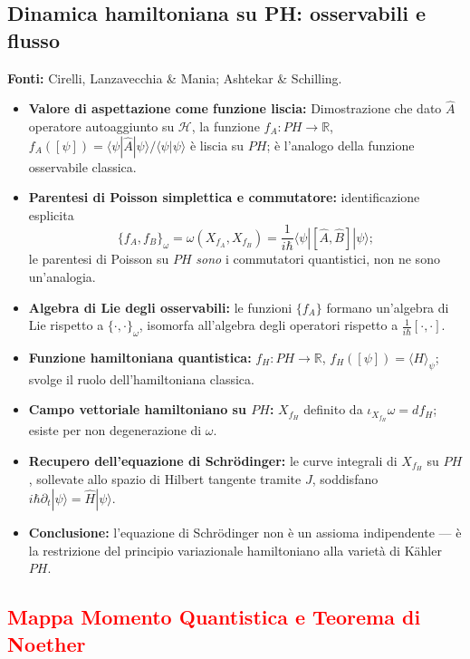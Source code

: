 \documentclass[12pt, a4paper]{article}
\newcommand{\fonti}[1]{%
	\begin{fontebox}
		\textcolor{fontecolor}{\footnotesize\textbf{Fonti:} #1}
	\end{fontebox}%
}
\begin{document}
	\subsection{Dinamica hamiltoniana su PH: osservabili e flusso}
	
	\fonti{Cirelli, Lanzavecchia \& Mania; Ashtekar \& Schilling.}
	
	\begin{itemize}
		\item \textbf{Valore di aspettazione come funzione liscia:} Dimostrazione che dato $\hat{A}$ operatore autoaggiunto su $\mathcal{H}$, la funzione $f_A: PH \to \mathbb{R}$, $f_A([\psi]) = \langle\psi|\hat{A}|\psi\rangle / \langle\psi|\psi\rangle$ è liscia su $PH$; è l'analogo della funzione osservabile classica.
		\item \textbf{Parentesi di Poisson simplettica e commutatore:} identificazione esplicita
		\[
		\{f_A, f_B\}_\omega = \omega(X_{f_A}, X_{f_B}) = \frac{1}{i\hbar}\langle\psi|[\hat{A},\hat{B}]|\psi\rangle;
		\]
		le parentesi di Poisson su $PH$ \emph{sono} i commutatori quantistici, non ne sono un'analogia.
		\item \textbf{Algebra di Lie degli osservabili:} le funzioni $\{f_A\}$ formano un'algebra di Lie rispetto a $\{\cdot,\cdot\}_\omega$, isomorfa all'algebra degli operatori rispetto a $\frac{1}{i\hbar}[\cdot,\cdot]$.
		\item \textbf{Funzione hamiltoniana quantistica:} $f_H: PH \to \mathbb{R}$, $f_H([\psi]) = \langle H\rangle_\psi$; svolge il ruolo dell'hamiltoniana classica.
		\item \textbf{Campo vettoriale hamiltoniano su $PH$:} $X_{f_H}$ definito da $\iota_{X_{f_H}}\omega = df_H$; esiste per non degenerazione di $\omega$.
		\item \textbf{Recupero dell'equazione di Schrödinger:} le curve integrali di $X_{f_H}$ su $PH$, sollevate allo spazio di Hilbert tangente tramite $J$, soddisfano $i\hbar\partial_t|\psi\rangle = \hat{H}|\psi\rangle$.
		\item \textbf{Conclusione:} l'equazione di Schrödinger non è un assioma indipendente --- è la restrizione del principio variazionale hamiltoniano alla varietà di Kähler $PH$.
	\end{itemize}
	
	\subsection{\textcolor{red}{Mappa Momento Quantistica e Teorema di Noether}}
	
\end{document}
